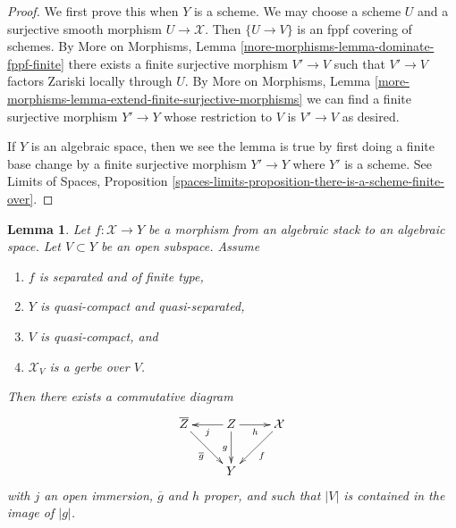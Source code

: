 \documentclass{stacks-project}
\theoremstyle{plain}
\newtheorem{lemma}[subsection]{Lemma}
\theoremstyle{definition}
\theoremstyle{remark}
\numberwithin{equation}{subsection}
\begin{document}
\begin{proof}
We first prove this when $Y$ is a scheme.
We may choose a scheme $U$ and a surjective smooth morphism
$U \to \mathcal{X}$. Then $\{U \to V\}$ is an fppf covering of schemes.
By More on Morphisms, Lemma \ref{more-morphisms-lemma-dominate-fppf-finite}
there exists a finite surjective morphism
$V' \to V$ such that $V' \to V$ factors Zariski locally
through $U$. By
More on Morphisms, Lemma
\ref{more-morphisms-lemma-extend-finite-surjective-morphisms}
we can find a finite surjective morphism $Y' \to Y$
whose restriction to $V$ is $V' \to V$ as desired.

\medskip\noindent
If $Y$ is an algebraic space, then we see the lemma is true by
first doing a finite base change by a finite surjective morphism
$Y' \to Y$ where $Y'$ is a scheme. See
Limits of Spaces, Proposition
\ref{spaces-limits-proposition-there-is-a-scheme-finite-over}.
\end{proof}

\begin{lemma}
\label{lemma-make-section}
Let $f : \mathcal{X} \to Y$ be a morphism from an algebraic stack
to an algebraic space. Let $V \subset Y$ be an open subspace.
Assume
\begin{enumerate}
\item $f$ is separated and of finite type,
\item $Y$ is quasi-compact and quasi-separated,
\item $V$ is quasi-compact, and
\item $\mathcal{X}_V$ is a gerbe over $V$.
\end{enumerate}
Then there exists a commutative diagram
$$
\xymatrix{
\overline{Z} \ar[rd]_{\overline{g}} &
Z \ar[l]^j \ar[d]_g \ar[r]_h & \mathcal{X} \ar[ld]^f \\
& Y
}
$$
with $j$ an open immersion, $\overline{g}$ and $h$ proper,
and such that $|V|$ is contained in the image of $|g|$.
\end{lemma}
\end{document}
